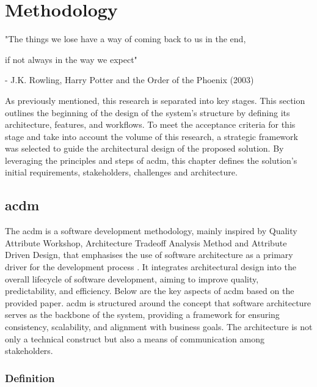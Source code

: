 \chapter{Methodology}
\label{chapter:methodology}

\begin{introduction}
"The things we lose have a way of coming back to us in the end,

if not always in the way we expect"

- J.K. Rowling, Harry Potter and the Order of the Phoenix (2003)
\end{introduction}

As previously mentioned, this research is separated into key stages. This section outlines the beginning of the design of the system's structure by defining its architecture, features, and workflows. To meet the acceptance criteria for this stage and take into account the volume of this research, a strategic framework was selected to guide the architectural design of the proposed solution. By leveraging the principles and steps of \ac{acdm}, this chapter defines the solution's initial requirements, stakeholders, challenges and architecture.

\section{\acl{acdm}} \label{section:acdm}

The \ac{acdm} is a software development methodology, mainly inspired by Quality Attribute Workshop, Architecture Tradeoff Analysis Method and Attribute Driven Design, that emphasises the use of software architecture as a primary driver for the development process \cite{Lattanze2005}. It integrates architectural design into the overall lifecycle of software development, aiming to improve quality, predictability, and efficiency. Below are the key aspects of \ac{acdm} based on the provided paper. \ac{acdm} is structured around the concept that software architecture serves as the backbone of the system, providing a framework for ensuring consistency, scalability, and alignment with business goals. The architecture is not only a technical construct but also a means of communication among stakeholders.


\subsection{Definition}


